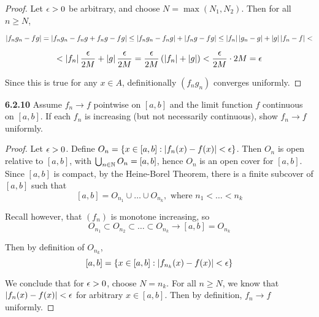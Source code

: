 \documentclass{exam}
\begin{document}
\begin{questions}
\begin{proof}
    Let $\epsilon > 0$ be arbitrary, and choose $N = \max(N_1, N_2)$. Then for all $n \geq N$,

    $$\left| f_ng_n - fg \right| = \left| f_ng_n - f_ng + f_ng - fg \right| \leq \left| f_ng_n - f_ng \right| + \left| f_ng - fg \right| \leq \left| f_n \right|\left| g_n - g \right| + \left| g \right|\left| f_n - f \right| < $$
    
    $$< \left| f_n \right|\frac{\epsilon}{2M} + \left| g \right|\frac{\epsilon}{2M} = \frac{\epsilon}{2M}\left( \left| f_n \right| + \left| g \right| \right) < \frac{\epsilon}{2M}\cdot 2M = \epsilon$$

    Since this is true for any $x \in A$, definitionally $(f_ng_n)$ converges uniformly.
\end{proof}

\newpage
\textbf{6.2.10 }
Assume $f_n \rightarrow f$ pointwise on $[a, b]$ and the limit function $f$ continuous on $[a, b]$. If each $f_n$ is increasing (but not necessarily continuous), show $f_n \rightarrow f$ uniformly.
\begin{proof}
    Let $\epsilon > 0$. Define $O_n = \left \{ x \in [a, b] : \left| f_n(x) - f(x) \right| < \epsilon \right \}$. Then $O_n$ is open relative to $[a, b]$, with $\bigcup_{n \in \mathbb {N}} O_n = [a, b]$, hence $O_n$ is an open cover for $[a, b]$. Since $[a, b]$ is compact, by the Heine-Borel Theorem, there is a finite subcover of $[a, b]$ such that
    $$[a, b] = O_{n_1} \cup \hdots \cup O_{n_k}, \text{ where } n_1 < \hdots < n_k$$

    Recall however, that $(f_n)$ is monotone increasing, so
    $$O_{n_1} \subset O_{n_2} \subset \hdots \subset O_{n_k} \longrightarrow [a, b] = O_{n_k}$$

    Then by definition of $O_{n_k}$,
    $$[a, b] = \left \{ x \in [a, b] : \left| f_{n_k}(x) - f(x) \right| < \epsilon \right \}$$

    We conclude that for $\epsilon > 0$, choose $N = n_k$. For all $n \geq N$, we know that $\left| f_n(x) - f(x) \right| < \epsilon$ for arbitrary $x \in [a, b]$. Then by definition, $f_n \rightarrow f$ uniformly.
    

    
\end{proof}
\end{questions}
\end{document}

